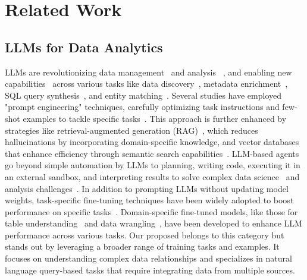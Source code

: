 \section{Related Work}
\label{sec:related_work}



\subsection{LLMs for Data Analytics}
LLMs are revolutionizing data management~\citep{wehrsteintowards} and analysis ~\citep{zhou2024llm}, and enabling new capabilities~\citep{fernandez2023large} across various tasks like data discovery~\citep{chorus}, metadata enrichment~\citep{nameguess,feuer2023archetype}, SQL query synthesis~\citep{zhang2024benchmarking}, and entity matching~\citep{zhang2024directions,peeters2023entity,zhang2024anymatch}.  
Several studies have employed "prompt engineering" techniques, carefully optimizing task instructions and few-shot examples to tackle specific tasks~\citep{llm_data_wrangling2022,peeters2023entity,chorus}. This approach is further enhanced by strategies like retrieval-augmented generation (RAG)~\citep{zhao2024chat2data}, which reduces hallucinations by incorporating domain-specific knowledge, and vector databases that enhance efficiency through semantic search capabilities~\citep{patel2024lotus}. 
%
LLM-based agents go beyond simple automation by LLMs to planning, writing code, executing it in an external sandbox, and interpreting results to solve complex data science~\citep{ds1000, dseval} and analysis challenges~\citep{InfiAgent-DABench,cao2024spider2}.
%
In addition to prompting LLMs without updating model weights, task-specific fine-tuning techniques have been widely adopted to boost performance on specific tasks~\citep{korini2024column,zhang2024anymatch}. 
%
Domain-specific fine-tuned models, like those for table understanding~\citep{table-gpt,su2024tablegpt2} and data wrangling~\citep{zhang2024directions, zhang2023jellyfish}, have been developed to enhance LLM performance across various tasks. 
%
Our proposed \modelname belongs to this category but stands out by leveraging a broader range of training tasks and examples. It focuses on understanding complex data relationships and specializes in natural language query-based tasks that require integrating data from multiple sources.


